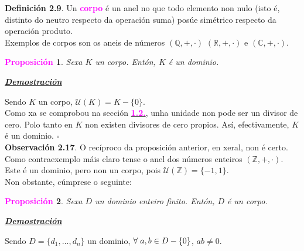\documentclass[twoside]{report}
\newcommand{\magbf}[1]{\textcolor{magenta}{\textbf{#1}}} %
\theoremstyle{mystyle}
\newtheorem{prop}{\magbf{Proposición}}[chapter]
\newenvironment{proposition}
{\begin{mdframed}[linecolor = magenta,backgroundcolor = classicrose, linewidth = 2mm]\begin{prop}}
{\end{prop}\end{mdframed}}
\begin{document}
\noindent \textbf{Definición 2.9}. Un \magbf{corpo} é un anel no que todo elemento non nulo (isto é, distinto do neutro respecto da operación suma) posúe simétrico respecto da operación produto.\\

\noindent Exemplos de corpos son os aneis de números $(\mathbb{Q},+,\cdot)$ $(\mathbb{R},+,\cdot)$ e $(\mathbb{C},+,\cdot)$.\\

\begin{proposition} \label{prop2.14}
Sexa $K$ un corpo. Entón, $K$ é un dominio.
\end{proposition}

\vspace{2mm}

\noindent \textbf{\textit{\underline{Demostración}}}

\vspace{2mm}

\noindent Sendo $K$ un corpo, $\mathcal{U}(K) = K - \{0\}$. \\

\noindent Como xa se comprobou na sección \hyperref[ElAnillo]{\magbf{1.2.}}, unha unidade non pode ser un divisor de cero. Polo tanto en $K$ non existen divisores de cero propios. Así, efectivamente, $K$ é un dominio. $\square$\\

\noindent \textbf{Observación 2.17}. O recíproco da proposición anterior, en xeral, non é certo. Como contraexemplo máis claro tense o anel dos números enteiros $(\mathbb{Z},+,\cdot)$. Este é un dominio, pero non un corpo, pois $\mathcal{U}(\mathbb{Z}) = \{-1,1\}$.\\

\noindent Non obstante, cúmprese o seguinte:\\

\begin{proposition} \label{prop2.15}
Sexa $D$ un dominio enteiro finito. Entón, $D$ é un corpo.
\end{proposition}

\vspace{2mm}

\noindent \textbf{\textit{\underline{Demostración}}}

\vspace{2mm}

\noindent Sendo $D = \{d_{1}, \ldots, d_{n}\}$ un dominio, $\forall \hspace{1mm} a,b \in D-\{0\}$, $ab \neq 0$.\\
\end{document}
